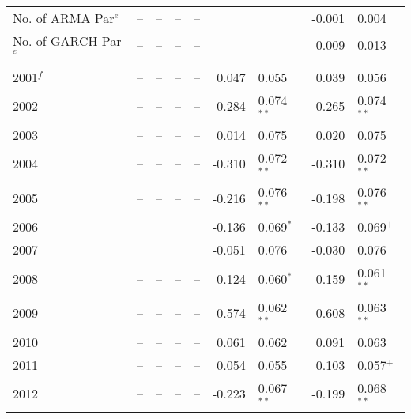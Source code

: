 \documentclass[12pt]{report}
\begin{document}
\begin{table}
\begin{tabular}{l r l r l r l r l}
        No. of ARMA Par$^{e}$              &      -- & --           &      -- & --           &         &              &  -0.001 & 0.004         \\
        No. of GARCH Par$^{e}$             &      -- & --           &      -- & --           &         &              &  -0.009 & 0.013         \\  \\      
        2001$^{f}$                         &      -- & --           &      -- & --           &   0.047 & 0.055        &   0.039 & 0.056         \\
        2002                               &      -- & --           &      -- & --           &  -0.284 & 0.074$^{**}$ &  -0.265 & 0.074$^{**}$  \\
        2003                               &      -- & --           &      -- & --           &   0.014 & 0.075        &   0.020 & 0.075         \\
        2004                               &      -- & --           &      -- & --           &  -0.310 & 0.072$^{**}$ &  -0.310 & 0.072$^{**}$  \\
        2005                               &      -- & --           &      -- & --           &  -0.216 & 0.076$^{**}$ &  -0.198 & 0.076$^{**}$  \\
        2006                               &      -- & --           &      -- & --           &  -0.136 & 0.069$^{*}$  &  -0.133 & 0.069$^{+}$   \\
        2007                               &      -- & --           &      -- & --           &  -0.051 & 0.076        &  -0.030 & 0.076         \\
        2008                               &      -- & --           &      -- & --           &   0.124 & 0.060$^{*}$  &   0.159 & 0.061$^{**}$  \\
        2009                               &      -- & --           &      -- & --           &   0.574 & 0.062$^{**}$ &   0.608 & 0.063$^{**}$  \\
        2010                               &      -- & --           &      -- & --           &   0.061 & 0.062        &   0.091 & 0.063         \\
        2011                               &      -- & --           &      -- & --           &   0.054 & 0.055        &   0.103 & 0.057$^{+}$   \\
        2012                               &      -- & --           &      -- & --           &  -0.223 & 0.067$^{**}$ &  -0.199 & 0.068$^{**}$  \\

\end{tabular}
\end{table}
\end{document}
